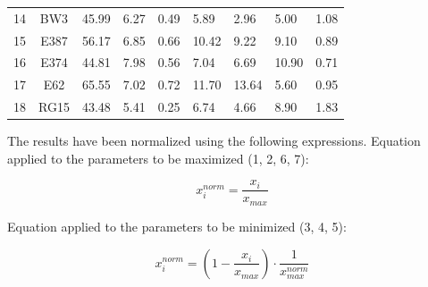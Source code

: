 \documentclass[../TFG_Annex.tex]{subfiles}
\begin{document}
\begin{table}[h!]
\begin{tabular}{cc|C{1.5cm}|C{1.5cm}|C{1.75cm}|C{1.5cm}|C{1.5cm}|C{1.5cm}|C{1.3cm}}
		14         & BW3     & 45.99 & 6.27    & 0.49                         & 5.89   & 2.96  & 5.00      & 1.08  \\
		15         & E387    & 56.17 & 6.85    & 0.66                         & 10.42  & 9.22  & 9.10      & 0.89  \\
		16         & E374    & 44.81 & 7.98    & 0.56                         & 7.04   & 6.69  & 10.90     & 0.71  \\
		17         & E62     & 65.55 & 7.02    & 0.72                         & 11.70  & 13.64 & 5.60      & 0.95  \\
		18         & RG15    & 43.48 & 5.41    & 0.25                         & 6.74   & 4.66  & 8.90      & 1.83 
	\end{tabular}
	
\end{table}



The results have been normalized using the following expressions. Equation applied to the parameters to be maximized (1, 2, 6, 7):

\begin{equation}
x_i^{norm} = \dfrac{x_i}{x_{max}} 
\end{equation}

Equation applied to the parameters to be minimized (3, 4, 5): 

\begin{equation}
x_i^{norm} = \left(1-\dfrac{x_i}{x_{max}}\right) \cdot \dfrac{1}{x_{max}^{norm}}
\end{equation}
\end{document}
